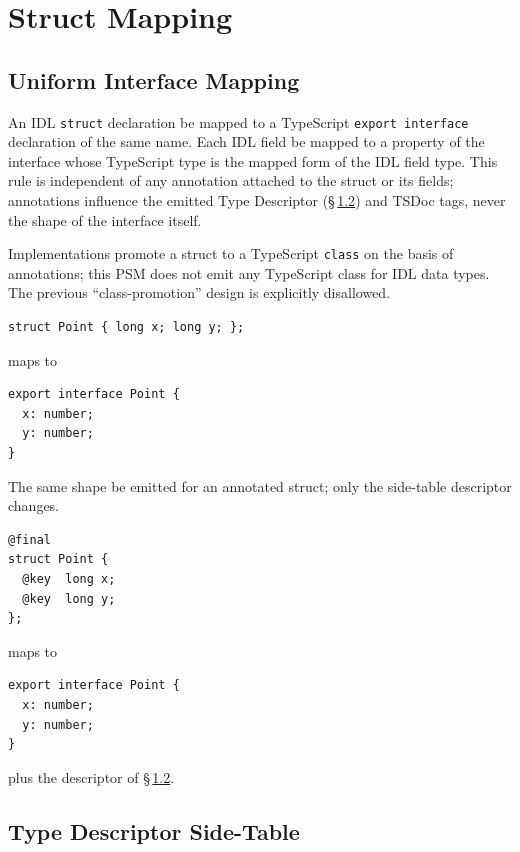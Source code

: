 \documentclass{../styles/zerodds-vendor-spec}
\begin{document}
\section{Struct Mapping}\label{sec:struct-mapping}

\subsection{Uniform Interface Mapping}\label{sec:struct-uniform}

An IDL \texttt{struct} declaration  be mapped to a
TypeScript \texttt{export interface} declaration of the same name.
Each IDL field  be mapped to a property of the
interface whose TypeScript type is the mapped form of the IDL
field type. This rule is independent of any annotation attached
to the struct or its fields; annotations  influence
the emitted Type Descriptor (\S\,\ref{sec:struct-descriptor}) and
TSDoc tags, never the shape of the interface itself.

Implementations  promote a struct to a TypeScript
\texttt{class} on the basis of annotations; this PSM does not
emit any TypeScript class for IDL data types. The previous
``class-promotion'' design is explicitly disallowed.

\begin{specexample}
\begin{lstlisting}
struct Point { long x; long y; };
\end{lstlisting}
maps to
\begin{lstlisting}
export interface Point {
  x: number;
  y: number;
}
\end{lstlisting}
\end{specexample}

The same shape  be emitted for an annotated struct;
only the side-table descriptor changes.

\begin{specexample}
\begin{lstlisting}
@final
struct Point {
  @key  long x;
  @key  long y;
};
\end{lstlisting}
maps to
\begin{lstlisting}
export interface Point {
  x: number;
  y: number;
}
\end{lstlisting}
plus the descriptor of \S\,\ref{sec:struct-descriptor}.
\end{specexample}

\subsection{Type Descriptor Side-Table}\label{sec:struct-descriptor}
\end{document}
